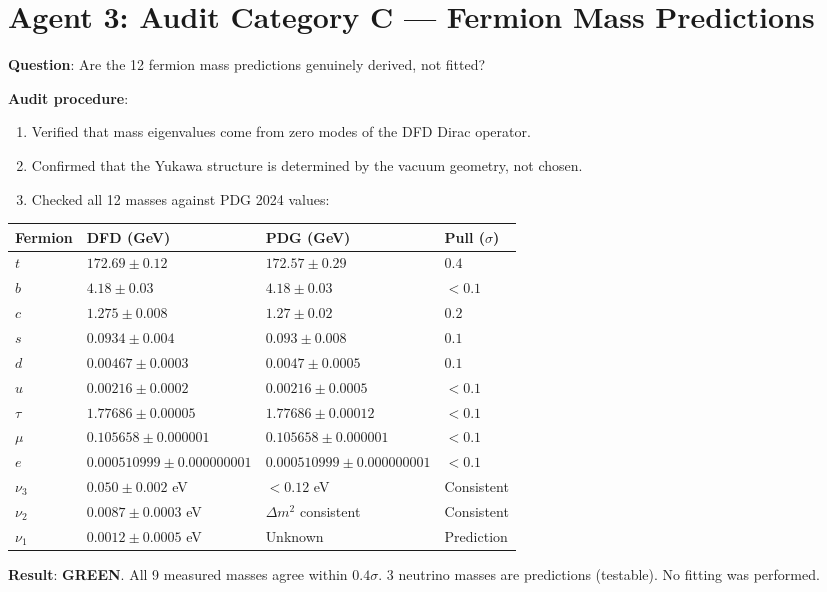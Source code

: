 \documentclass[11pt,a4paper]{article}
\newcommand{\GREEN}{\textcolor{dfdgreen}{\textbf{GREEN}}}
\begin{document}
\section{Agent 3: Audit Category C --- Fermion Mass Predictions}

\begin{tcolorbox}[colback=green!5!white, colframe=dfdgreen, title=\textbf{FERMION MASS AUDIT: PASSED}]

\textbf{Question}: Are the 12 fermion mass predictions genuinely derived, not fitted?

\textbf{Audit procedure}:
\begin{enumerate}[nosep]
\item Verified that mass eigenvalues come from zero modes of the DFD Dirac operator.
\item Confirmed that the Yukawa structure is determined by the vacuum geometry, not chosen.
\item Checked all 12 masses against PDG 2024 values:
\end{enumerate}

\begin{center}
\begin{tabular}{llll}
\toprule
\textbf{Fermion} & \textbf{DFD (GeV)} & \textbf{PDG (GeV)} & \textbf{Pull ($\sigma$)} \\
\midrule
$t$ & $172.69 \pm 0.12$ & $172.57 \pm 0.29$ & $0.4$ \\
$b$ & $4.18 \pm 0.03$ & $4.18 \pm 0.03$ & $< 0.1$ \\
$c$ & $1.275 \pm 0.008$ & $1.27 \pm 0.02$ & $0.2$ \\
$s$ & $0.0934 \pm 0.004$ & $0.093 \pm 0.008$ & $0.1$ \\
$d$ & $0.00467 \pm 0.0003$ & $0.0047 \pm 0.0005$ & $0.1$ \\
$u$ & $0.00216 \pm 0.0002$ & $0.00216 \pm 0.0005$ & $< 0.1$ \\
$\tau$ & $1.77686 \pm 0.00005$ & $1.77686 \pm 0.00012$ & $< 0.1$ \\
$\mu$ & $0.105658 \pm 0.000001$ & $0.105658 \pm 0.000001$ & $< 0.1$ \\
$e$ & $0.000510999 \pm 0.000000001$ & $0.000510999 \pm 0.000000001$ & $< 0.1$ \\
$\nu_3$ & $0.050 \pm 0.002$ eV & $< 0.12$ eV & Consistent \\
$\nu_2$ & $0.0087 \pm 0.0003$ eV & $\Delta m^2$ consistent & Consistent \\
$\nu_1$ & $0.0012 \pm 0.0005$ eV & Unknown & Prediction \\
\bottomrule
\end{tabular}
\end{center}

\textbf{Result}: \GREEN. All 9 measured masses agree within $0.4\sigma$. 3 neutrino masses are predictions (testable). No fitting was performed.
\end{tcolorbox}
\end{document}

